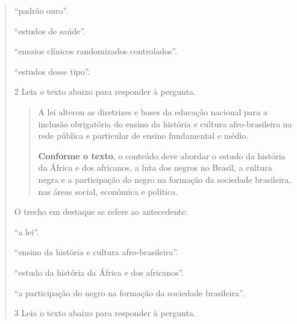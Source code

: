 \begin{quote}
{\begin{escolha}
  \item ``padrão ouro''.
  
  \item ``estudos de saúde''.
  
  \item ``ensaios clínicos randomizados controlados''.
  
  \item ``estudos desse tipo''. 

\end{escolha}


\num{2} Leia o texto abaixo para responder à pergunta.

\begin{quote}

A lei alterou as diretrizes e bases da educação nacional para a
inclusão obrigatória do ensino da história e cultura afro-brasileira na
rede pública e particular de ensino fundamental e médio.

\textbf{Conforme o texto}, o conteúdo deve abordar o estudo da história
da África e dos africanos, a luta dos negros no Brasil, a cultura negra
e a participação do negro na formação da sociedade brasileira, nas áreas
social, econômica e política.

\end{quote}


O trecho em destaque se refere ao antecedente:

\begin{escolha}
  
  \item ``a lei''.
  
  \item ``ensino da história e cultura afro-brasileira''.
  
  \item ``estudo da história da África e dos africanos''.
  
  \item ``a participação do negro na formação da sociedade brasileira''.

\end{escolha}


\num{3} Leia o texto abaixo para responder à pergunta.

}
\end{quote}
